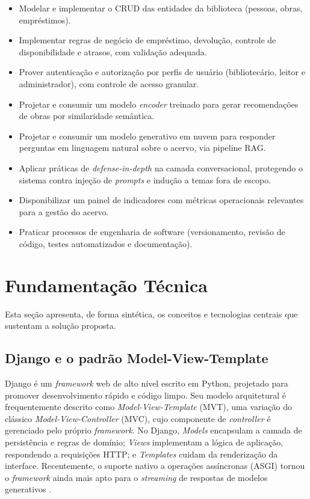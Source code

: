 \documentclass[monografia,abnt]{inf-ufg-modificado}
\begin{document}
\begin{itemize}
    \item Modelar e implementar o CRUD das entidades da biblioteca (pessoas, obras, empréstimos).
    \item Implementar regras de negócio de empréstimo, devolução, controle de disponibilidade e atrasos, com validação adequada.
    \item Prover autenticação e autorização por perfis de usuário (bibliotecário, leitor e administrador), com controle de acesso granular.
    \item Projetar e consumir um modelo \textit{encoder} treinado para gerar recomendações de obras por similaridade semântica.
    \item Projetar e consumir um modelo generativo em nuvem para responder perguntas em linguagem natural sobre o acervo, via pipeline RAG.
    \item Aplicar práticas de \textit{defense-in-depth} na camada conversacional, protegendo o sistema contra injeção de \textit{prompts} e indução a temas fora de escopo.
    \item Disponibilizar um painel de indicadores com métricas operacionais relevantes para a gestão do acervo.
    \item Praticar processos de engenharia de software (versionamento, revisão de código, testes automatizados e documentação).
\end{itemize}

\chapter{Fundamentação Técnica}

Esta seção apresenta, de forma sintética, os conceitos e tecnologias centrais que sustentam a solução proposta.

\section{Django e o padrão Model-View-Template}

Django é um \textit{framework} web de alto nível escrito em Python, projetado para promover desenvolvimento rápido e código limpo. Seu modelo arquitetural é frequentemente descrito como \textit{Model-View-Template} (MVT), uma variação do clássico \textit{Model-View-Controller} (MVC), cujo componente de \textit{controller} é gerenciado pelo próprio \textit{framework}. No Django, \textit{Models} encapsulam a camada de persistência e regras de domínio; \textit{Views} implementam a lógica de aplicação, respondendo a requisições HTTP; e \textit{Templates} cuidam da renderização da interface. Recentemente, o suporte nativo a operações assíncronas (ASGI) tornou o \textit{framework} ainda mais apto para o \textit{streaming} de respostas de modelos generativos \cite{vincent}.
\end{document}

